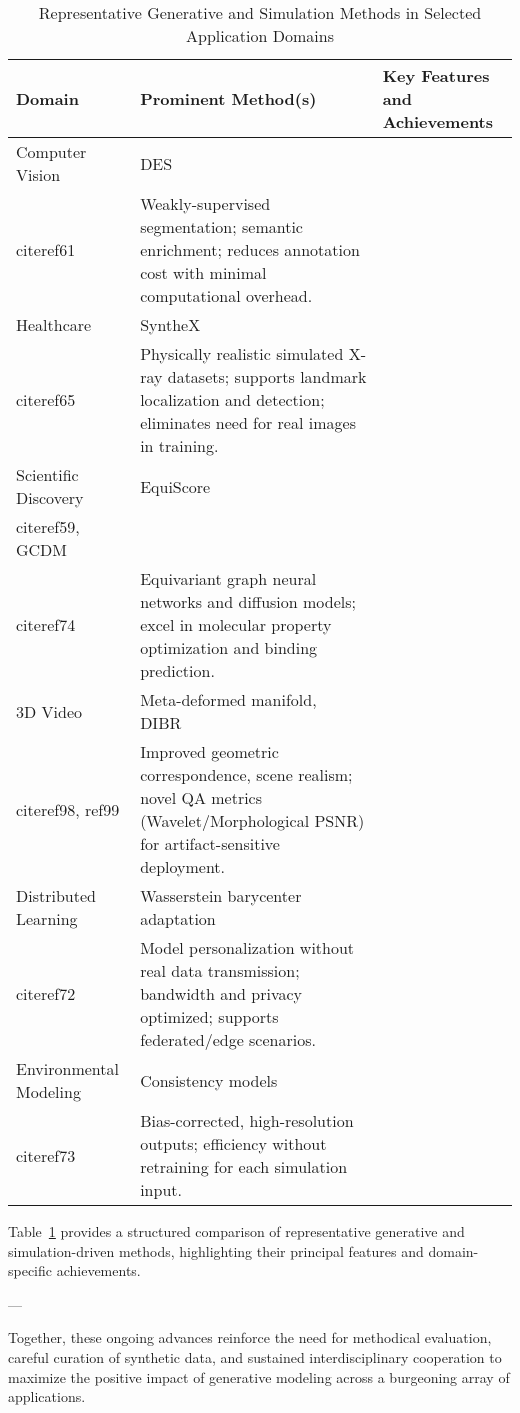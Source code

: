 \documentclass[11pt]{article}
\begin{document}
\begin{table}[ht]
\centering
\caption{Representative Generative and Simulation Methods in Selected Application Domains}
\label{tab:method_comparison}
\begin{tabular}{|l|l|p{6cm}|}
\hline
\textbf{Domain} & \textbf{Prominent Method(s)} & \textbf{Key Features and Achievements} \\
\hline
Computer Vision & DES~\\cite{ref61} & Weakly-supervised segmentation; semantic enrichment; reduces annotation cost with minimal computational overhead. \\
\hline
Healthcare & SyntheX~\\cite{ref65} & Physically realistic simulated X-ray datasets; supports landmark localization and detection; eliminates need for real images in training. \\
\hline
Scientific Discovery & EquiScore~\\cite{ref59}, GCDM~\\cite{ref74} & Equivariant graph neural networks and diffusion models; excel in molecular property optimization and binding prediction. \\
\hline
3D Video & Meta-deformed manifold, DIBR~\\cite{ref98, ref99} & Improved geometric correspondence, scene realism; novel QA metrics (Wavelet/Morphological PSNR) for artifact-sensitive deployment. \\
\hline
Distributed Learning & Wasserstein barycenter adaptation~\\cite{ref72} & Model personalization without real data transmission; bandwidth and privacy optimized; supports federated/edge scenarios. \\
\hline
Environmental Modeling & Consistency models~\\cite{ref73} & Bias-corrected, high-resolution outputs; efficiency without retraining for each simulation input. \\
\hline
\end{tabular}
\end{table}

Table~\ref{tab:method_comparison} provides a structured comparison of representative generative and simulation-driven methods, highlighting their principal features and domain-specific achievements.

---

Together, these ongoing advances reinforce the need for methodical evaluation, careful curation of synthetic data, and sustained interdisciplinary cooperation to maximize the positive impact of generative modeling across a burgeoning array of applications.
\end{document}
